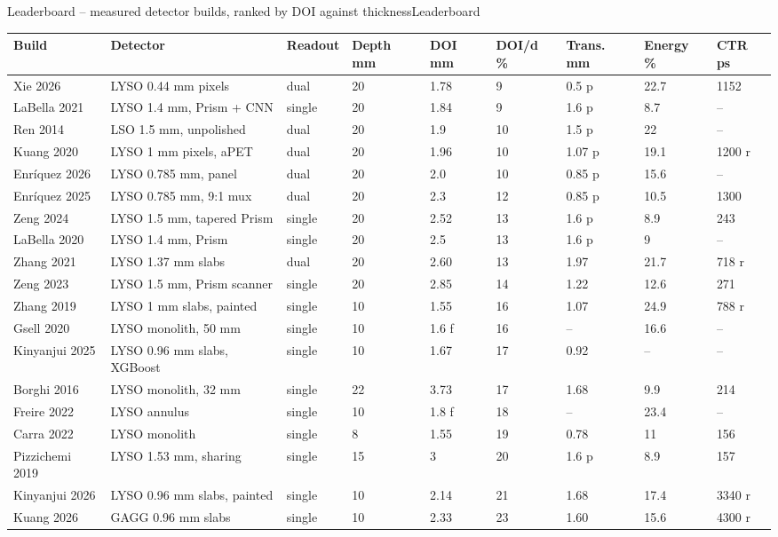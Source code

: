 \begin{programnote}{Leaderboard -- measured detector builds, ranked by DOI against thickness}{Leaderboard}
\begin{center}
\begin{scriptsize}
\setlength{\tabcolsep}{1.5pt}
\begin{tabular}{lllllllll}
\hline
Build & Detector & Readout & Depth mm & DOI mm & DOI/d \% & Trans. mm & Energy \% & CTR ps \\
\hline
Xie 2026 & LYSO 0.44 mm pixels & dual & 20 & 1.78 & 9 & 0.5 p & 22.7 & 1152 \\
LaBella 2021 & LYSO 1.4 mm, Prism + CNN & single & 20 & 1.84 & 9 & 1.6 p & 8.7 & -- \\
Ren 2014 & LSO 1.5 mm, unpolished & dual & 20 & 1.9 & 10 & 1.5 p & 22 & -- \\
Kuang 2020 & LYSO 1 mm pixels, aPET & dual & 20 & 1.96 & 10 & 1.07 p & 19.1 & 1200 r \\
Enríquez 2026 & LYSO 0.785 mm, panel & dual & 20 & 2.0 & 10 & 0.85 p & 15.6 & -- \\
Enríquez 2025 & LYSO 0.785 mm, 9:1 mux & dual & 20 & 2.3 & 12 & 0.85 p & 10.5 & 1300 \\
Zeng 2024 & LYSO 1.5 mm, tapered Prism & single & 20 & 2.52 & 13 & 1.6 p & 8.9 & 243 \\
LaBella 2020 & LYSO 1.4 mm, Prism & single & 20 & 2.5 & 13 & 1.6 p & 9 & -- \\
Zhang 2021 & LYSO 1.37 mm slabs & dual & 20 & 2.60 & 13 & 1.97 & 21.7 & 718 r \\
Zeng 2023 & LYSO 1.5 mm, Prism scanner & single & 20 & 2.85 & 14 & 1.22 & 12.6 & 271 \\
Zhang 2019 & LYSO 1 mm slabs, painted & single & 10 & 1.55 & 16 & 1.07 & 24.9 & 788 r \\
Gsell 2020 & LYSO monolith, 50 mm & single & 10 & 1.6 f & 16 & -- & 16.6 & -- \\
Kinyanjui 2025 & LYSO 0.96 mm slabs, XGBoost & single & 10 & 1.67 & 17 & 0.92 & -- & -- \\
Borghi 2016 & LYSO monolith, 32 mm & single & 22 & 3.73 & 17 & 1.68 & 9.9 & 214 \\
Freire 2022 & LYSO annulus & single & 10 & 1.8 f & 18 & -- & 23.4 & -- \\
Carra 2022 & LYSO monolith & single & 8 & 1.55 & 19 & 0.78 & 11 & 156 \\
Pizzichemi 2019 & LYSO 1.53 mm, sharing & single & 15 & 3 & 20 & 1.6 p & 8.9 & 157 \\
Kinyanjui 2026 & LYSO 0.96 mm slabs, painted & single & 10 & 2.14 & 21 & 1.68 & 17.4 & 3340 r \\
Kuang 2026 & GAGG 0.96 mm slabs & single & 10 & 2.33 & 23 & 1.60 & 15.6 & 4300 r \\

\end{tabular}
\end{scriptsize}
\end{center}
\end{programnote}
